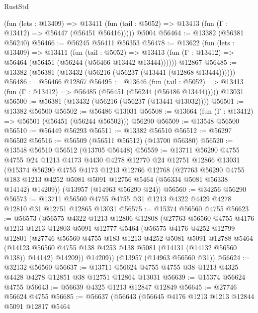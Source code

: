 \begin{lexlean}{RustStd}
\begin{coremodule}
      (fun (lets : @13409) =>
      @13411 (fun (tail : @5052) => @13413 (fun (Γ : @13412) => @56447 (@56451 @56416)))))
    @5004
@56464 := @13382 (@56381 @56240)
@56466 := @56245 @56411 @56353
@56478 := @13622
    (fun (lets : @13409) =>
    @13411
      (fun (tail : @5052) =>
      @13413 (fun (Γ : @13412) => @56464 (@56451 (@56244 (@56466 @13442 @13444))))))
    @12867
@56485 := @13382 (@56381 (@13432 (@56216 (@56237 (@13441 (@12868 @13444))))))
@56486 := @56466 @12867
@56495 := @13646
    (fun (tail : @5052) => @13413 (fun (Γ : @13412) => @56485 (@56451 (@56244 (@56486 @13444)))))
    @13031
@56500 := @56381 (@13432 (@56216 (@56237 (@13441 @13032))))
@56501 := @13382 @56500
@56502 := @56486 @13031
@56508 := @13664 (fun (Γ : @13412) => @56501 (@56451 (@56244 @56502))) @56290
@56509 := @13548 @56500
@56510 := @56449 @56293
@56511 := @13382 @56510
@56512 := @56297 @56502
@56516 := @56509 (@56511 @56512) (@13700 @56380)
@56520 := @13548 @56510 @56512 (@13705 @56448)
@56559 := @13711
    @56290
    @4755
    @4755
    @24
    @1213
    @4173
    @4430
    @4278
    @12770
    @24
    @12751
    @12866
    @13031
    (@15374
      @56290
      @4755
      @4173
      @1213
      @12766
      @12768
      (@27763
        @56290
        @4755
        @183
        @1213
        @4252
        @5081
        @5091
        @12756
        @5464
        (@56334 @5081 @56338 @14142)
        @14209))
    (@13957 (@14963 @56290 @24))
@56560 := @34256 @56290
@56573 := @13711 @56560 @4755 @4755 @31 @1213 @4322 @4429 @4278 @12810 @31 @12751 @12865 @13031
@56575 := @15374 @56560 @4755
@56623 := @56573
    (@56575
      @4322
      @1213
      @12806
      @12808
      (@27763
        @56560
        @4755
        @4176
        @1213
        @1213
        @12803
        @5091
        @12777
        @5464
        (@56575
          @4176
          @4252
          @12799
          @12801
          (@27746
            @56560
            @4755
            @183
            @1213
            @4252
            @5081
            @5091
            @12788
            @5464
            (@14123 @56560 @4755 @138 @4253 @138 @5081 (@14131 (@14132 @56560 @138)) @14142)
            @14209))
        @14209))
    (@13957 (@14963 @56560 @31))
@56624 := @32132 @56560
@56637 := @13711 @56624 @4755 @4755 @38 @1213 @4325 @4428 @4278 @12851 @38 @12751 @12864 @13031
@56639 := @15374 @56624 @4755
@56643 := @56639 @4325 @1213 @12847 @12849
@56645 := @27746 @56624 @4755
@56685 := @56637
    (@56643
      (@56645
        @4176
        @1213
        @1213
        @12844
        @5091
        @12817
        @5464

\end{coremodule}
\end{lexlean}
